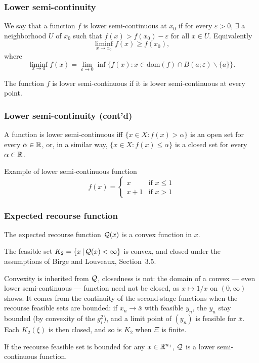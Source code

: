 \documentclass[aspectratio=169]{beamer}
\begin{document}
\begin{frame}
\frametitle{Lower semi-continuity}

We say that a function $f$ is {\blue lower semi-continuous at $x_0$} if for every $\varepsilon > 0$, $\exists$ a neighborhood $U$ of $x_0$ such that $f(x) > f(x_0) - \varepsilon$ for all $x \in U$.
Equivalently
\[
\liminf_{x \to x_{0}} f(x) \geq f(x_{0}),
\]
where
\[
\liminf_{x \to a} f(x) = \lim_{\varepsilon \to 0} \inf \{ f(x) : x
\in \mbox{dom}(f) \cap B(a;\varepsilon) \backslash \{a\} \}.
\]

\mbox{}

The function $f$ is {\blue lower semi-continuous} if it is lower semi-continuous at every point.

\end{frame}

\begin{frame}
\frametitle{Lower semi-continuity (cont'd)}

A function is lower semi-continuous iff $\lbrace x\in X : f(x) > \alpha \rbrace$ is an open set for every  $\alpha \in {\mathbb{R}}$, or, in a similar way, $\lbrace x\in X : f(x) \leq \alpha \rbrace$ is a closed set for every $\alpha \in {\mathbb{R}}$.

\mbox{}

Example of lower semi-continuous function
$$
f(x) =
\begin{cases}
x & \text{if } x \leq 1 \\
x + 1 & \text{if } x > 1
\end{cases}
$$

\end{frame}

\begin{frame}
\frametitle{Expected recourse function}

\begin{corollary}
The expected recourse function ${\mathcal{Q}}(x)$ is a convex function in $x$.
\end{corollary}

\begin{corollary}
The feasible set $K_2 = \lbrace x \,|\, {\mathcal{Q}}(x) < \infty \rbrace$ is convex, and closed under the assumptions of Birge and Louveaux, Section~3.5.
\end{corollary}
{\footnotesize Convexity is inherited from ${\mathcal{Q}}$, closedness is not: the domain of a convex --- even lower semi-continuous --- function need not be closed, as $x \mapsto 1/x$ on $(0,\infty)$ shows. It comes from the continuity of the second-stage functions when the recourse feasible sets are bounded: if $x_n \to \bar{x}$ with feasible $y_n$, the $y_n$ stay bounded (by convexity of the $g_i^2$), and a limit point of $(y_n)$ is feasible for $\bar{x}$. Each $K_2(\xi)$ is then closed, and so is $K_2$ when $\Xi$ is finite.}

\begin{corollary}
If the recourse feasible set is bounded for any $x \in {\mathbb{R}}^{n_1}$, ${\mathcal{Q}}$ is a lower semi-continuous function.
\end{corollary}

\end{frame}
\end{document}
